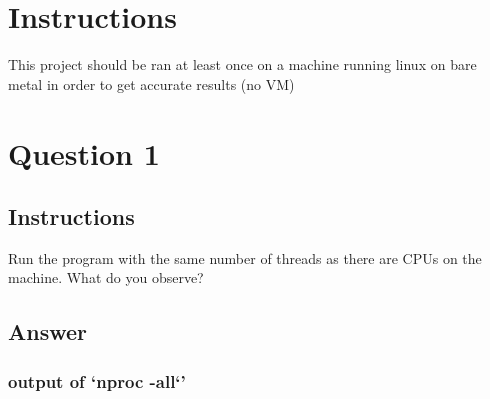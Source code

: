\documentclass{assignment-x}
\begin{document}
\maketitle
\pagebreak

\section{Instructions}
This project should be ran at least once on a machine running linux on bare metal in order to get accurate results (no VM)

\section{Question 1}
\subsection{Instructions}
Run the program with the same number of threads as there are CPUs on the machine. What do you observe?
\subsection{Answer}
\subsubsection{output of `nproc -all`'}
\end{document}
